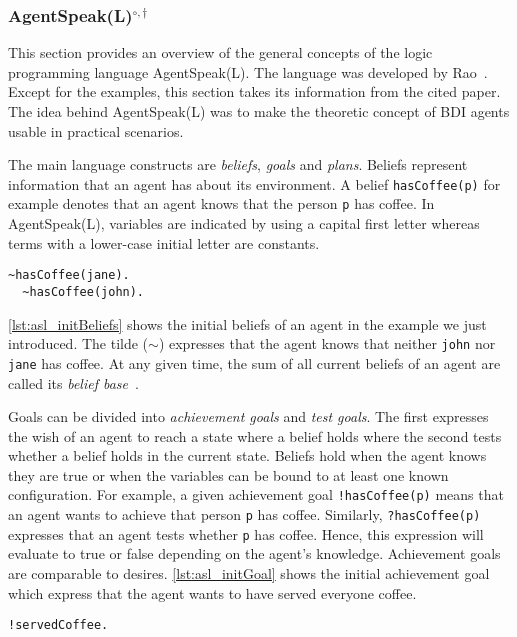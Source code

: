 \subsubsection[AgentSpeak(L)]{AgentSpeak(L)$^{\circ,\dagger}$}\label{fun:apl_asl}
This section provides an overview of the general concepts of the logic programming language AgentSpeak(L).
The language was developed by Rao~\cite{anand_AgentSpeak_1996}.
Except for the examples, this section takes its information from the cited paper.
The idea behind AgentSpeak(L) was to make the theoretic concept of BDI agents usable in practical scenarios. %

The main language constructs are \emph{beliefs}, \emph{goals} and \emph{plans}.
Beliefs represent information that an agent has about its environment.
A belief \texttt{hasCoffee(p)} for example denotes that an agent knows that the person \texttt{p} has coffee.
In AgentSpeak(L), variables are indicated by using a capital first letter whereas terms with a lower-case initial letter are constants. %
\begin{lstlisting}[caption={Initial beliefs.}, label=lst:asl_initBeliefs]
  ~hasCoffee(jane).
  ~hasCoffee(john).
\end{lstlisting}
\autoref{lst:asl_initBeliefs} shows the initial beliefs of an agent in the example we just introduced.
The tilde ($\sim$) expresses that the agent knows that neither \texttt{john} nor \texttt{jane} has coffee.
At any given time, the sum of all current beliefs of an agent are called its \emph{belief base}~\cite{bordini_jason_2005}. %

Goals can be divided into \emph{achievement goals} and \emph{test goals}.
The first expresses the wish of an agent to reach a state where a belief holds where the second tests whether a belief holds in the current state.
Beliefs hold when the agent knows they are true or when the variables can be bound to at least one known configuration.
For example, a given achievement goal \texttt{!hasCoffee(p)} means that an agent wants to achieve that person \texttt{p} has coffee.
Similarly, \texttt{?hasCoffee(p)} expresses that an agent tests whether \texttt{p} has coffee.
Hence, this expression will evaluate to true or false depending on the agent's knowledge.
Achievement goals are comparable to desires. %
\autoref{lst:asl_initGoal} shows the initial achievement goal which express that the agent wants to have served everyone coffee.
\begin{lstlisting}[firstnumber=3, caption={Initial goal.}, label=lst:asl_initGoal]
  !servedCoffee.
\end{lstlisting}

